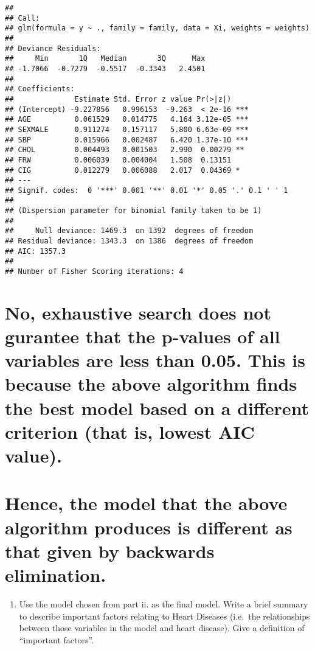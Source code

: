 \documentclass[]{article}
\providecommand{\tightlist}{%
  \setlength{\itemsep}{0pt}\setlength{\parskip}{0pt}}
\begin{document}
\begin{verbatim}
## 
## Call:
## glm(formula = y ~ ., family = family, data = Xi, weights = weights)
## 
## Deviance Residuals: 
##     Min       1Q   Median       3Q      Max  
## -1.7066  -0.7279  -0.5517  -0.3343   2.4501  
## 
## Coefficients:
##              Estimate Std. Error z value Pr(>|z|)    
## (Intercept) -9.227856   0.996153  -9.263  < 2e-16 ***
## AGE          0.061529   0.014775   4.164 3.12e-05 ***
## SEXMALE      0.911274   0.157117   5.800 6.63e-09 ***
## SBP          0.015966   0.002487   6.420 1.37e-10 ***
## CHOL         0.004493   0.001503   2.990  0.00279 ** 
## FRW          0.006039   0.004004   1.508  0.13151    
## CIG          0.012279   0.006088   2.017  0.04369 *  
## ---
## Signif. codes:  0 '***' 0.001 '**' 0.01 '*' 0.05 '.' 0.1 ' ' 1
## 
## (Dispersion parameter for binomial family taken to be 1)
## 
##     Null deviance: 1469.3  on 1392  degrees of freedom
## Residual deviance: 1343.3  on 1386  degrees of freedom
## AIC: 1357.3
## 
## Number of Fisher Scoring iterations: 4
\end{verbatim}

\section{No, exhaustive search does not gurantee that the p-values of
all variables are less than 0.05. This is because the above algorithm
finds the best model based on a different criterion (that is, lowest AIC
value).}\label{no-exhaustive-search-does-not-gurantee-that-the-p-values-of-all-variables-are-less-than-0.05.-this-is-because-the-above-algorithm-finds-the-best-model-based-on-a-different-criterion-that-is-lowest-aic-value.}

\section{Hence, the model that the above algorithm produces is different
as that given by backwards
elimination.}\label{hence-the-model-that-the-above-algorithm-produces-is-different-as-that-given-by-backwards-elimination.}

\begin{enumerate}
\def\labelenumi{\roman{enumi}.}
\setcounter{enumi}{2}
\tightlist
\item
  Use the model chosen from part ii. as the final model. Write a brief
  summary to describe important factors relating to Heart Diseases
  (i.e.~the relationships between those variables in the model and heart
  disease). Give a definition of ``important factors''.
\end{enumerate}
\end{document}
